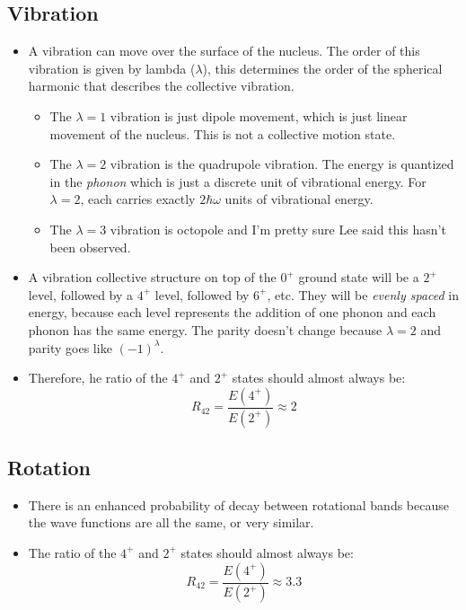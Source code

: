 \documentclass[letter]{article}
\begin{document}
\subsection{Vibration}
\begin{itemize}
\item A vibration can move over the surface of the nucleus. The order
  of this vibration is given by lambda ($\lambda$), this determines
  the order of the spherical harmonic that describes the collective vibration.
  \begin{itemize}
  \item The $\lambda=1$ vibration is just dipole movement, which
    is just linear movement of the nucleus. This is not a collective
    motion state.
  \item The $\lambda=2$ vibration is the quadrupole vibration. The
    energy is quantized in the \textit{phonon} which is just a
    discrete unit of vibrational energy. For $\lambda=2$, each carries
    exactly $2\hbar\omega$ units of vibrational energy.
  \item The $\lambda=3$ vibration is octopole and I'm pretty sure Lee
    said this hasn't been observed.
  \end{itemize}
\cite[Lec 13-16]{lecture}
\item A vibration collective structure on top of the $0^+$ ground
  state will be a $2^+$ level, followed by a $4^+$ level, followed by
  $6^+$, etc.  They will be
  \textit{evenly spaced} in energy, because each level represents the
  addition of one phonon and each phonon has the same energy. The
  parity doesn't change because $\lambda=2$ and parity goes like
  $(-1)^\lambda$.~\cite[Lec 13-16]{lecture}
\item Therefore, he ratio of the $4^+$ and $2^+$ states should almost always be:
  \begin{equation*}
    R_{42}=\frac{E(4^+)}{E(2^+)} \approx 2
  \end{equation*}

\end{itemize}

\subsection{Rotation}
\begin{itemize}
\item There is an enhanced probability of decay between rotational
  bands because the wave functions are all the same, or very similar.
\item The ratio of the $4^+$ and $2^+$ states should almost always be:
  \begin{equation*}
    R_{42}=\frac{E(4^+)}{E(2^+)} \approx 3.3
  \end{equation*}

\end{itemize}
\end{document}
